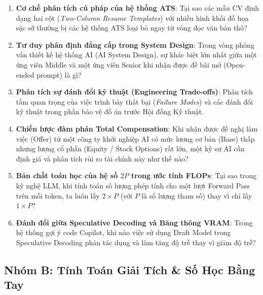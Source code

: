 \begin{enumerate}[label=\textbf{A\arabic*.}]
  \item \textbf{Cơ chế phân tích cú pháp của hệ thống ATS}: Tại sao các mẫu CV định dạng hai cột (\textit{Two-Column Resume Templates}) với nhiều hình khối đồ họa sặc sỡ thường bị các hệ thống ATS loại bỏ ngay từ vòng đọc văn bản thô?
  \item \textbf{Tư duy phân định đẳng cấp trong System Design}: Trong vòng phỏng vấn thiết kế hệ thống AI (AI System Design), sự khác biệt lớn nhất giữa một ứng viên Middle và một ứng viên Senior khi nhận được đề bài mở (Open-ended prompt) là gì?
  \item \textbf{Phân tích sự đánh đổi kỹ thuật (Engineering Trade-offs)}: Phân tích tầm quan trọng của việc trình bày thất bại (\textit{Failure Modes}) và các đánh đổi kỹ thuật trong phần bảo vệ đồ án trước Hội đồng Kỹ thuật.
  \item \textbf{Chiến lược đàm phán Total Compensation}: Khi nhận được đề nghị làm việc (Offer) từ một công ty khởi nghiệp AI có mức lương cơ bản (Base) thấp nhưng lượng cổ phần (Equity / Stock Options) rất lớn, một kỹ sư AI cần định giá và phân tích rủi ro tài chính này như thế nào?
  \item \textbf{Bản chất toán học của hệ số $2P$ trong ước tính FLOPs}: Tại sao trong kỹ nghệ LLM, khi tính toán số lượng phép tính cho một lượt Forward Pass trên mỗi token, ta luôn lấy $2 \times P$ (với $P$ là số lượng tham số) thay vì chỉ lấy $1 \times P$?
  \item \textbf{Đánh đổi giữa Speculative Decoding và Băng thông VRAM}: Trong hệ thống gợi ý code Copilot, khi nào việc sử dụng Draft Model trong Speculative Decoding phản tác dụng và làm tăng độ trễ thay vì giảm độ trễ?
\end{enumerate}

\subsection{Nhóm B: Tính Toán Giải Tích \& Số Học Bằng Tay}

